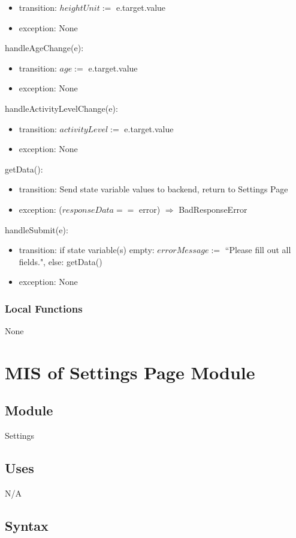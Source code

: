 \documentclass[12pt, titlepage]{article}
\begin{document}
\begin{itemize}
	\item transition: $heightUnit:=$ e.target.value
	\item exception: None
\end{itemize}
\noindent handleAgeChange(e):
\begin{itemize}
	\item transition: $age :=$ e.target.value
	\item exception: None
\end{itemize}
\noindent handleActivityLevelChange(e):
\begin{itemize}
	\item transition: $activityLevel :=$ e.target.value
	\item exception: None
\end{itemize}
\noindent getData():
\begin{itemize}
	\item transition: Send state variable values to backend, return to Settings 
	Page
	\item exception: ($responseData ==$ error) $\Rightarrow$ BadResponseError
\end{itemize}
\noindent handleSubmit(e):
\begin{itemize}
	\item transition: if state variable(s) empty: $errorMessage :=$ ``Please 
	fill out all fields.", else: getData()
	\item exception: None
\end{itemize}

\subsubsection{Local Functions}
None

\newpage

\section{MIS of Settings Page Module}
\subsection{Module}
Settings
\subsection{Uses}
N/A
\subsection{Syntax}
\end{document}
